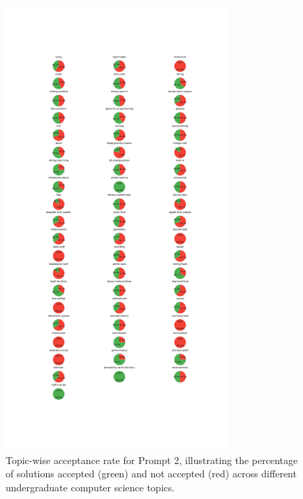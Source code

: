 \begin{figure}[H]
    \centering
    \includegraphics[width=0.75\textwidth, height=0.7\textheight]{figures/2/accepted_not_topicwise.jpg}
    \caption{Topic-wise acceptance rate for Prompt 2, illustrating the percentage of solutions accepted (green) and not accepted (red) across different undergraduate computer science topics.}
    \label{fig:topic_wise_acceptance_prompt_2}
\end{figure}

